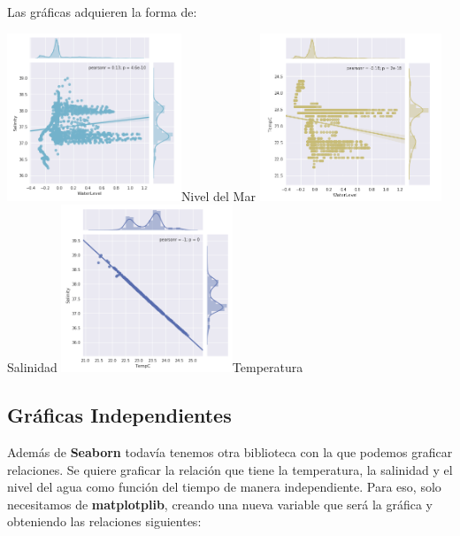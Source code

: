 \documentclass{article}
\begin{document}
Las gráficas adquieren la forma de:

	\begin{center}
    \includegraphics[height=5cm]{regd3.png}{Nivel del Mar}
    \includegraphics[height=5cm]{regsar.png}{Salinidad}
    \includegraphics[height=5cm]{regsal.png}{Temperatura}
    \end{center}

\subsection{Gráficas Independientes}
Además de \textbf{Seaborn} todavía tenemos otra biblioteca con la que podemos graficar relaciones. Se quiere graficar la relación que tiene la temperatura, la salinidad y el nivel del agua como función del tiempo de manera independiente. Para eso, solo necesitamos de \textbf{matplotplib}, creando una nueva variable que será la gráfica y obteniendo las relaciones siguientes:
\end{document}
